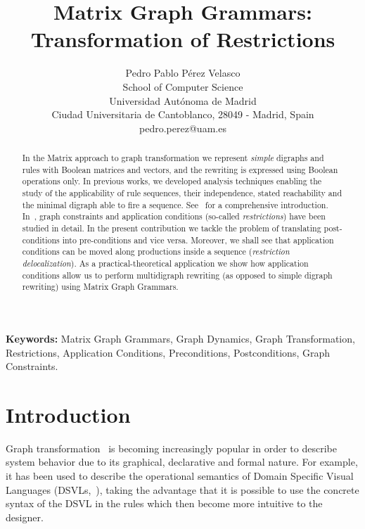 \documentclass{fundam}
\begin{document}
\setcounter{page}{1}


\title{Matrix Graph Grammars: Transformation of Restrictions}

\author{Pedro Pablo P\'erez Velasco\\
School of Computer Science \\
Universidad Aut\'onoma de Madrid\\    	
Ciudad Universitaria de Cantoblanco, 28049 - Madrid, Spain\\
pedro.perez{@}uam.es}

\maketitle


\begin{abstract}
  In the Matrix approach to graph transformation we represent
  \emph{simple} digraphs and rules with Boolean matrices and vectors,
  and the rewriting is expressed using Boolean operations only. In
  previous works, we developed analysis techniques enabling the study
  of the applicability of rule sequences, their independence, stated
  reachability and the minimal digraph able to fire a
  sequence. See~\cite{MGGBook} for a comprehensive
  introduction. In~\cite{MGGfundamenta}, graph constraints and
  application conditions (so-called \emph{restrictions}) have been
  studied in detail. In the present contribution we tackle the problem
  of translating post-conditions into pre-conditions and vice
  versa. Moreover, we shall see that application conditions can be
  moved along productions inside a sequence (\emph{restriction
    delocalization}). As a practical-theoretical application we show
  how application conditions allow us to perform multidigraph
  rewriting (as opposed to simple digraph rewriting) using Matrix
  Graph Grammars.
\end{abstract}

\textbf{Keywords:} Matrix Graph Grammars, Graph Dynamics, Graph
Transformation, Restrictions, Application Conditions, Preconditions,
Postconditions, Graph Constraints.

\section{Introduction}
\label{sec:intro}


Graph transformation~\cite{graGraBook,handbook} is becoming
increasingly popular in order to describe system behavior due to its
graphical, declarative and formal nature. For example, it has been
used to describe the operational semantics of Domain Specific Visual
Languages (DSVLs,~\cite{JVLC}), taking the advantage that it is
possible to use the concrete syntax of the DSVL in the rules which
then become more intuitive to the designer.
\end{document}
